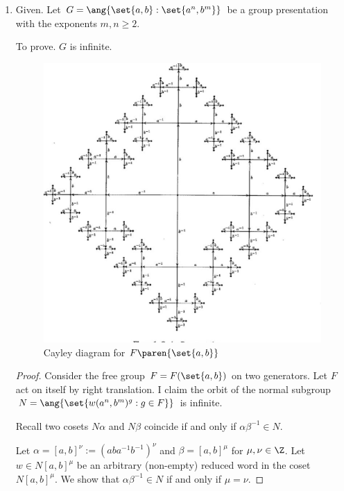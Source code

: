 \documentclass[onesided]{ccg-pset}
\begin{document}
\begin{enumerate}
        \begin{proof}
            Define $Q = R \cup \set{\text{simple commutators }[x,y] \text{for all }x,y \in X}$. The normal closure of $Q$ includes the commutator subgroup of $\ang{X}$, which yields a quotient map $\ang{X \mid R} \surj \ang{X \mid Q}$ onto an abelian group. Let $Z$ denote the set of relations in $Q$ which are not simple commutators. From our hypothesis, $Z$ has cardinality strictly less than $X$. In the free abelian group $\Z\set{X}$, the relations in $Z$ produce a underdetermined system of $\Z$-linear relations on the generators in $X$. In the vector space $\Z\set{X} \otimes \Q$, the dimension of the subspace spanned by the solutions to these relations has strictly positive codimension. Thence the quotient of $\Z\set{X} \otimes \Q$ is infinite. Taking fibers over both projections yields the proposition.
        \end{proof}

    \item Given. Let $G = \ang{\set{a,b} : \set{a^n, b^m}}$ be a group presentation with the exponents $m,n \ge 2$.

        To prove. $G$ is infinite.
\begin{figure}[htpb]
    \centering
    \includegraphics[width=0.25\linewidth]{2019-09-11-cayley.png}
    \caption{Cayley diagram for $F\paren{\set{a,b}}$}
    \label{fig:cayley}
\end{figure}
        \begin{proof}
            Consider the free group $F = F(\set{a,b})$ on two generators. Let $F$ act on itself by right translation. I claim the orbit of the normal subgroup $N = \ang{\set{w(a^n, b^m)^{g} : g \in F}}$ is infinite. 

            Recall two cosets $N\alpha$ and $N\beta$ coincide if and only if $\alpha\beta^{-1} \in N$. 

            Let $\alpha = [a,b]^{\nu}:=(aba^{-1}b^{-1})^{\nu}$ and $\beta = [a,b]^\mu$ for $\mu, \nu \in \Z$. Let $w \in N [a,b]^\mu$ be an arbitrary (non-empty) reduced word in the coset $N [a,b]^\mu$. We show that $\alpha\beta^{-1} \in N$ if and only if $\mu = \nu$. 


\end{proof}
\end{enumerate}
\end{document}
